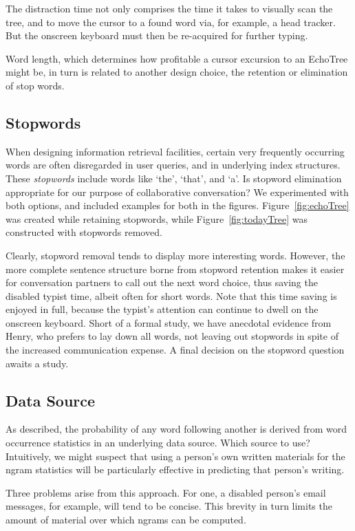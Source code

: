 \documentclass{sigchi}
\begin{document}
The distraction time not only comprises the time it takes to visually
scan the tree, and to move the cursor to a found word via, for
example, a head tracker. But the onscreen keyboard must then be
re-acquired for further typing. 

Word length, which determines how profitable a cursor excursion to an
EchoTree might be, in turn is related to another design choice, the
retention or elimination of stop words.

\subsection{Stopwords}

When designing information retrieval facilities, certain very
frequently occurring words are often disregarded in user queries, and
in underlying index structures. These {\em stopwords} include words
like `the', `that', and `a'. Is stopword elimination appropriate for
our purpose of collaborative conversation? We experimented with both
options, and included examples for both in the
figures. Figure~\ref{fig:echoTree} was created while retaining
stopwords, while Figure~\ref{fig:todayTree} was constructed with
stopwords removed.

Clearly, stopword removal tends to display more interesting
words. However, the more complete sentence structure borne from
stopword retention makes it easier for conversation partners to call
out the next word choice, thus saving the disabled typist time, albeit
often for short words. Note that this time saving is enjoyed in full,
because the typist's attention can continue to dwell on the onscreen
keyboard. Short of a formal study, we have anecdotal evidence from
Henry, who prefers to lay down all words, not leaving out stopwords in
spite of the increased communication expense. A final decision on the
stopword question awaits a study.

\subsection{Data Source}

As described, the probability of any word following another is derived
from word occurrence statistics in an underlying data source. Which
source to use? Intuitively, we might suspect that using a person's own
written materials for the ngram statistics will be particularly
effective in predicting that person's writing.

Three problems arise from this approach. For one, a disabled person's
email messages, for example, will tend to be concise. This brevity in
turn limits the amount of material over which ngrams can be computed.
\end{document}

